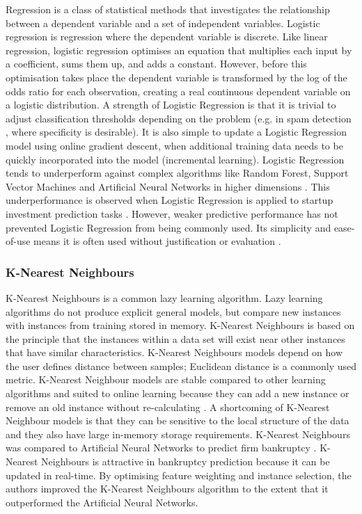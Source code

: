 \documentclass[../thesis/thesis.tex]{subfiles}
\begin{document}
Regression is a class of statistical methods that investigates the relationship between a dependent variable and a set of independent variables. Logistic regression is regression where the dependent variable is discrete. Like linear regression, logistic regression optimises an equation that multiplies each input by a coefficient, sums them up, and adds a constant. However, before this optimisation takes place the dependent variable is transformed by the log of the odds ratio for each observation, creating a real continuous dependent variable on a logistic distribution. A strength of Logistic Regression is that it is trivial to adjust classification thresholds depending on the problem (e.g. in spam detection \cite{friedman2001}, where specificity is desirable). It is also simple to update a Logistic Regression model using online gradient descent, when additional training data needs to be quickly incorporated into the model (incremental learning). Logistic Regression tends to underperform against complex algorithms like Random Forest, Support Vector Machines and Artificial Neural Networks in higher dimensions \cite{caruana2008}. This underperformance is observed when Logistic Regression is applied to startup investment prediction tasks \cite{beckwith2016, bhat2011}. However, weaker predictive performance has not prevented Logistic Regression from being commonly used. Its simplicity and ease-of-use means it is often used without justification or evaluation \cite{gimmon2010}.

\subsubsection{K-Nearest Neighbours}

K-Nearest Neighbours is a common lazy learning algorithm. Lazy learning algorithms do not produce explicit general models, but compare new instances with instances from training stored in memory. K-Nearest Neighbours is based on the principle that the instances within a data set will exist near other instances that have similar characteristics. K-Nearest Neighbours models depend on how the user defines distance between samples; Euclidean distance is a commonly used metric. K-Nearest Neighbour models are stable compared to other learning algorithms and suited to online learning because they can add a new instance or remove an old instance without re-calculating \cite{kotsiantis2007}. A shortcoming of K-Nearest Neighbour models is that they can be sensitive to the local structure of the data and they also have large in-memory storage requirements. K-Nearest Neighbours was compared to Artificial Neural Networks to predict firm bankruptcy \cite{ahn2008}. K-Nearest Neighbours is attractive in bankruptcy prediction because it can be updated in real-time. By optimising feature weighting and instance selection, the authors improved the K-Nearest Neighbours algorithm to the extent that it outperformed the Artificial Neural Networks.
\end{document}
